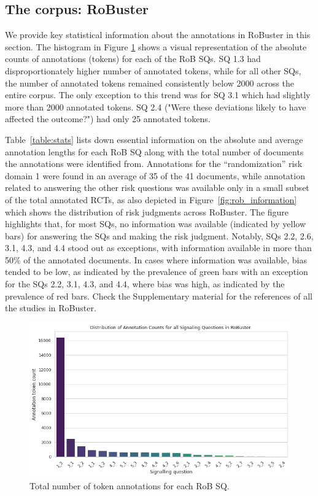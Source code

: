 \documentclass[sn-mathphys,Numbered]{sn-jnl}%
\theoremstyle{thmstyleone}%
\theoremstyle{thmstyletwo}%
\theoremstyle{thmstylethree}%
\begin{document}
\subsection{The corpus: RoBuster}
\label{subsec:corpus}
%
We provide key statistical information about the annotations in RoBuster in this section.
The histogram in Figure \ref{fig:ann_counts} shows a visual representation of the absolute counts of annotations (tokens) for each of the RoB SQs.
SQ 1.3 had disproportionately higher number of annotated tokens, while for all other SQs, the number of annotated tokens remained consistently below 2000 across the entire corpus.
The only exception to this trend was for SQ 3.1 which had slightly more than 2000 annotated tokens.
SQ 2.4 ("Were these deviations likely to have affected the outcome?") had only 25 annotated tokens.


Table~\ref{table:stats} lists down essential information on the absolute and average annotation lengths for each RoB SQ along with the total number of documents the annotations were identified from.
Annotations for the ``randomization'' risk domain 1 were found in an average of 35 of the 41 documents, while annotation related to answering the other risk questions was available only in a small subset of the total annotated RCTs, as also depicted in Figure~\ref{fig:rob_information} which shows the distribution of risk judgments across RoBuster.
The figure highlights that, for most SQs, no information was available (indicated by yellow bars) for answering the SQs and making the risk judgment.
Notably, SQs 2.2, 2.6, 3.1, 4.3, and 4.4 stood out as exceptions, with information available in more than 50\% of the annotated documents.
In cases where information was available, bias tended to be low, as indicated by the prevalence of green bars with an exception for the SQs 2.2, 3.1, 4.3, and 4.4, where bias was high, as indicated by the prevalence of red bars.
Check the Supplementary material for the references of all the studies in RoBuster.
%
%
%
\begin{figure}[htb]
    \centering
    \includegraphics[width=0.90\columnwidth]{figures/annot_counts.png}
    \caption{Total number of token annotations for each RoB SQ.}
    \label{fig:ann_counts}
\end{figure}
%
%
%
\end{document}
